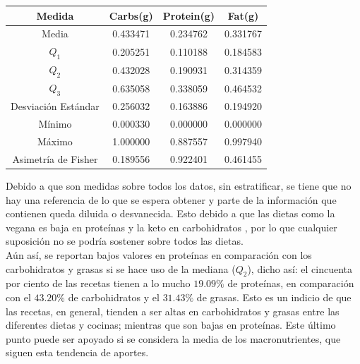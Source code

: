 \documentclass[12pt,a4paper]{article}
\begin{document}
        \begin{center}
            \begin{tabular}{| c | c c c |}
                \toprule
                Medida & Carbs(g) & Protein(g) & Fat(g) \\
                \midrule
                Media               & 0.433471 & 0.234762 & 0.331767 \\
                $Q_1$               & 0.205251 & 0.110188 & 0.184583 \\
                $Q_2$               & 0.432028 & 0.190931 & 0.314359 \\
                $Q_3$               & 0.635058 & 0.338059 & 0.464532 \\
                Desviación Estándar & 0.256032 & 0.163886 & 0.194920 \\
                Mínimo              & 0.000330 & 0.000000 & 0.000000 \\
                Máximo              & 1.000000 & 0.887557 & 0.997940 \\
                Asimetría de Fisher & 0.189556 & 0.922401 & 0.461455 \\
                \bottomrule
            \end{tabular}
        \end{center}

        Debido a que son medidas sobre todos los datos, sin estratificar, 
        se tiene que no hay una referencia de lo que se espera obtener y 
        parte de la información que contienen queda diluida o desvanecida. 
        Esto debido a que las dietas como la vegana es baja en proteínas y 
        la keto en carbohidratos \cite{marvastipopular}, por lo que cualquier 
        suposición no se podría sostener sobre todos las dietas.\\

        Aún así, se reportan bajos valores en proteínas en comparación 
        con los carbohidratos y grasas si se hace uso de la mediana ($Q_2$), 
        dicho así: el cincuenta por ciento de las recetas tienen a lo mucho  
        $19.09\%$ de proteínas, en comparación con el $43.20\%$ de carbohidratos 
        y el $31.43\%$ de grasas. Esto es un indicio de que las recetas, en general, 
        tienden a ser altas en carbohidratos y grasas entre las diferentes dietas y 
        cocinas; mientras que son bajas en proteínas. Este último punto puede ser apoyado si se considera la media de los 
        macronutrientes, que siguen esta tendencia de aportes.\\
\end{document}
